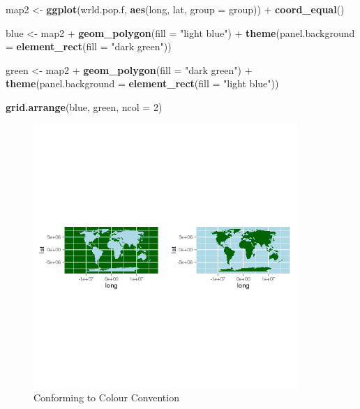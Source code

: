 \documentclass[]{article}
\newenvironment{Shaded}{}{}
\newcommand{\KeywordTok}[1]{\textcolor[rgb]{0.00,0.44,0.13}{\textbf{{#1}}}}
\newcommand{\DataTypeTok}[1]{\textcolor[rgb]{0.56,0.13,0.00}{{#1}}}
\newcommand{\DecValTok}[1]{\textcolor[rgb]{0.25,0.63,0.44}{{#1}}}
\newcommand{\StringTok}[1]{\textcolor[rgb]{0.25,0.44,0.63}{{#1}}}
\newcommand{\NormalTok}[1]{{#1}}
\let\Oldincludegraphics\includegraphics
\renewcommand{\includegraphics}[1]{\Oldincludegraphics[width=10cm]{#1}}
\begin{document}
\begin{Shaded}
\begin{Highlighting}[]
\NormalTok{map2 <- }\KeywordTok{ggplot}\NormalTok{(wrld.pop.f, }\KeywordTok{aes}\NormalTok{(long, lat, }\DataTypeTok{group =} \NormalTok{group)) + }\KeywordTok{coord_equal}\NormalTok{()}

\NormalTok{blue <- map2 + }\KeywordTok{geom_polygon}\NormalTok{(}\DataTypeTok{fill =} \StringTok{"light blue"}\NormalTok{) + }\KeywordTok{theme}\NormalTok{(}\DataTypeTok{panel.background =} \KeywordTok{element_rect}\NormalTok{(}\DataTypeTok{fill =} \StringTok{"dark green"}\NormalTok{))}

\NormalTok{green <- map2 + }\KeywordTok{geom_polygon}\NormalTok{(}\DataTypeTok{fill =} \StringTok{"dark green"}\NormalTok{) + }\KeywordTok{theme}\NormalTok{(}\DataTypeTok{panel.background =} \KeywordTok{element_rect}\NormalTok{(}\DataTypeTok{fill =} \StringTok{"light blue"}\NormalTok{))}

\KeywordTok{grid.arrange}\NormalTok{(blue, green, }\DataTypeTok{ncol =} \DecValTok{2}\NormalTok{)}
\end{Highlighting}
\end{Shaded}

\begin{figure}[htbp]
\centering
\includegraphics{figure/Conforming_to_Colour_Convention.png}
\caption{Conforming to Colour Convention}
\end{figure}
\end{document}
